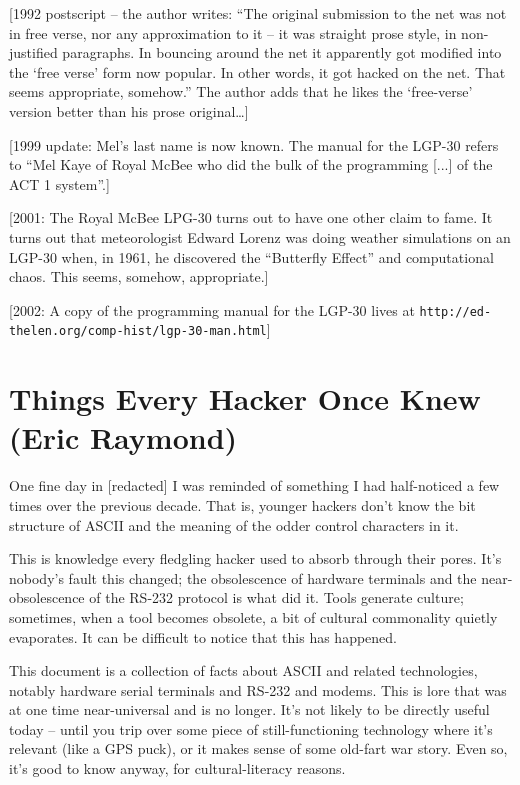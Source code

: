 \documentclass[10pt,twoside,openright]{memoir}
\begin{document}
\vskip 0.4in

[1992 postscript -- the author writes: ``The original submission to the net was not in free verse, nor any approximation to it -- it was straight prose style, in non-justified paragraphs. In bouncing around the net it apparently got modified into the `free verse' form now popular. In other words, it got hacked on the net. That seems appropriate, somehow.'' The author adds that he likes the `free-verse' version better than his prose original\dots]

[1999 update: Mel's last name is now known. The manual for the LGP-30 refers to ``Mel Kaye of Royal McBee who did the bulk of the programming [...] of the ACT 1 system''.]

[2001: The Royal McBee LPG-30 turns out to have one other claim to fame. It turns out that meteorologist Edward Lorenz was doing weather simulations on an LGP-30 when, in 1961, he discovered the ``Butterfly Effect'' and computational chaos. This seems, somehow, appropriate.]

[2002: A copy of the programming manual for the LGP-30 lives at {\footnotesize \texttt{http://ed-thelen.org/comp-hist/lgp-30-man.html}}]


\chapter{Things Every Hacker Once Knew (Eric Raymond)}

One fine day in [redacted] I was reminded of something I had half-noticed a few times over the previous decade. That is, younger hackers don't know the bit structure of ASCII and the meaning of the odder control characters in it.

This is knowledge every fledgling hacker used to absorb through their pores. It's nobody's fault this changed; the obsolescence of hardware terminals and the near-obsolescence of the RS-232 protocol is what did it. Tools generate culture; sometimes, when a tool becomes obsolete, a bit of cultural commonality quietly evaporates. It can be difficult to notice that this has happened.

This document is a collection of facts about ASCII and related technologies, notably hardware serial terminals and RS-232 and modems. This is lore that was at one time near-universal and is no longer. It's not likely to be directly useful today -- until you trip over some piece of still-functioning technology where it's relevant (like a GPS puck), or it makes sense of some old-fart war story. Even so, it's good to know anyway, for cultural-literacy reasons.
\end{document}
